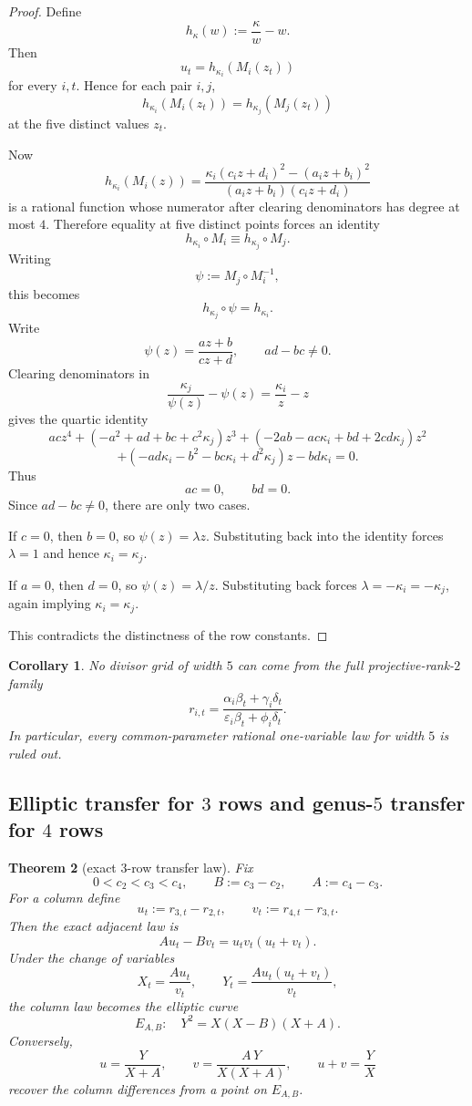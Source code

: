 \documentclass[11pt]{article}
\theoremstyle{plainbreak}
\newtheorem{theorem}{Theorem}[section]
\newtheorem{corollary}[theorem]{Corollary}
\theoremstyle{defbreak}
\begin{document}
\begin{proof}
Define
\[
h_\kappa(w):=\frac{\kappa}{w}-w.
\]
Then
\[
u_t=h_{\kappa_i}(M_i(z_t))
\]
for every $i,t$. Hence for each pair $i,j$,
\[
h_{\kappa_i}(M_i(z_t))=h_{\kappa_j}(M_j(z_t))
\]
at the five distinct values $z_t$.

Now
\[
h_{\kappa_i}(M_i(z))
=
\frac{\kappa_i(c_i z+d_i)^2-(a_i z+b_i)^2}
{(a_i z+b_i)(c_i z+d_i)}
\]
is a rational function whose numerator after clearing denominators has degree at most $4$. Therefore equality at five distinct points forces an identity
\[
h_{\kappa_i}\circ M_i \equiv h_{\kappa_j}\circ M_j.
\]
Writing
\[
\psi:=M_j\circ M_i^{-1},
\]
this becomes
\[
h_{\kappa_j}\circ \psi = h_{\kappa_i}.
\]
Write
\[
\psi(z)=\frac{az+b}{cz+d},\qquad ad-bc\ne 0.
\]
Clearing denominators in
\[
\frac{\kappa_j}{\psi(z)}-\psi(z)=\frac{\kappa_i}{z}-z
\]
gives the quartic identity
\[
ac z^4+(-a^2+ad+bc+c^2\kappa_j)z^3+(-2ab-ac\kappa_i+bd+2cd\kappa_j)z^2
\]
\[
+(-ad\kappa_i-b^2-bc\kappa_i+d^2\kappa_j)z-bd\kappa_i=0.
\]
Thus
\[
ac=0,\qquad bd=0.
\]
Since $ad-bc\ne 0$, there are only two cases.

If $c=0$, then $b=0$, so $\psi(z)=\lambda z$. Substituting back into the identity forces $\lambda=1$ and hence $\kappa_i=\kappa_j$.

If $a=0$, then $d=0$, so $\psi(z)=\lambda/z$. Substituting back forces $\lambda=-\kappa_i=-\kappa_j$, again implying $\kappa_i=\kappa_j$.

This contradicts the distinctness of the row constants.
\end{proof}

\begin{corollary}
No divisor grid of width $5$ can come from the full projective-rank-$2$ family
\[
r_{i,t}
=
\frac{\alpha_i\beta_t+\gamma_i\delta_t}
{\varepsilon_i\beta_t+\phi_i\delta_t}.
\]
In particular, every common-parameter rational one-variable law for width $5$ is ruled out.
\end{corollary}

\subsection{Elliptic transfer for $3$ rows and genus-$5$ transfer for $4$ rows}

\begin{theorem}[exact $3$-row transfer law]
Fix
\[
0<c_2<c_3<c_4,
\qquad
B:=c_3-c_2,\qquad A:=c_4-c_3.
\]
For a column define
\[
u_t:=r_{3,t}-r_{2,t},\qquad
v_t:=r_{4,t}-r_{3,t}.
\]
Then the exact adjacent law is
\[
A u_t-B v_t=u_t v_t(u_t+v_t).
\]
Under the change of variables
\[
X_t=\frac{A u_t}{v_t},\qquad
Y_t=\frac{A u_t(u_t+v_t)}{v_t},
\]
the column law becomes the elliptic curve
\[
E_{A,B}:\quad Y^2=X(X-B)(X+A).
\]
Conversely,
\[
u=\frac{Y}{X+A},\qquad
v=\frac{A\,Y}{X(X+A)},\qquad
u+v=\frac{Y}{X}
\]
recover the column differences from a point on $E_{A,B}$.
\end{theorem}
\end{document}
